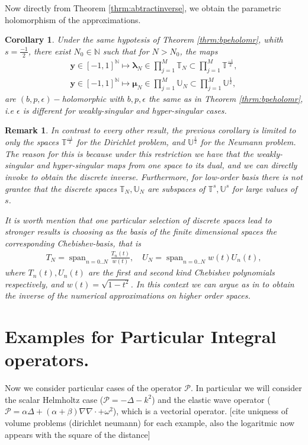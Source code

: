 \documentclass{article}
\newtheorem{corollary}[theorem]{Corollary}
\newtheorem{remark}[theorem]{Remark}
\newcommand{\todo}[1]{{\color{red}[#1]}}
\newcommand{\bmu} {\bm{\mu}}
\newcommand{\IN}{{\mathbb N}}
\newcommand{\IU}{{\mathbb U}}
\newcommand{\IT}{{\mathbb T}}
\newcommand{\cP}{\mathcal{P}}
\newcommand{\bla}{\boldsymbol \lambda}
\newcommand{\by}{\bm{y}}
\DeclareMathOperator{\spn}{span}
\begin{document}
Now directly from Theorem \ref{thrm:abtractinverse}, we obtain the parametric holomorphism of the approximations. 
\begin{corollary}
Under the same hypotesis of Theorem \ref{thrm:bpeholomr}, whith $s = \frac{-1}{2}$, there exist $N_0 \in \IN$ such that for $N>N_0$, the maps 
\begin{align*}
\by \in [-1,1]^{\IN} \mapsto \bla_N \in \prod_{j=1}^M \IT_N \subset \prod_{j=1}^M \IT^{\frac{-1}{2}},\\
\by \in [-1,1]^{\IN} \mapsto \bmu_N \in \prod_{j=1}^M \IU_N \subset \prod_{j=1}^M \IU^{\frac{1}{2}},
\end{align*}
are  $(b,p,\epsilon)-$holomorphic with $b,p,\epsilon$ the same as in Theorem \ref{thrm:bpeholomr}, i.e $\epsilon$ is different for weakly-singular and hyper-singular cases.
\end{corollary}

\begin{remark}
In contrast to every other result, the previous corollary is limited to only the spaces $\IT^{\frac{-1}{2}}$ for the Dirichlet problem, and $\IU^{\frac{1}{2}}$ for the Neumann problem. The reason for this is because under this restriction we have that the weakly-singular and hyper-singular maps from one space to its dual, and we can directly invoke \cite[Theorem 4.2.9]{Sauter:2011} to obtain the discrete inverse. Furthermore, for low-order basis there is not grantee that the discrete spaces $\IT_N, \IU_N$ are subspaces of $\IT^s,\IU^s$ for large values of $s$.

It is worth mention that one particular selection of discrete spaces lead to stronger results is choosing as the basis of the finite dimensional spaces the corresponding Chebishev-basis, that is 
\begin{align*}
T_N =  \spn_{n =0..N} \frac{T_n(t)}{w(t)}, \quad 
U_N =  \spn_{n =0..N} w(t)U_n(t),
\end{align*}
where $T_n(t), U_n(t)$ are the first and second kind Chebishev polynomials respectively, and $w(t) = \sqrt{1-t^2}$. In this context we can argue as in \cite[Chapter 9.8]{saranen2013periodic} to obtain the inverse of the numerical approximations on higher order spaces. 
\end{remark}


\section{Examples for Particular Integral operators.}
Now we consider particular cases of the operator $\cP$. In particular we will consider the scalar Helmholtz case ($\cP  = -\Delta - k^2$) and the elastic wave operator 
($\cP = 
\alpha \Delta + (\alpha +\beta) \nabla \nabla \cdot  + \omega^2
$), which is a vectorial operator.
\todo{cite uniqness of volume problems (dirichlet neumann) for each example, also the logaritmic now appears with the square of the distance}
\end{document}
